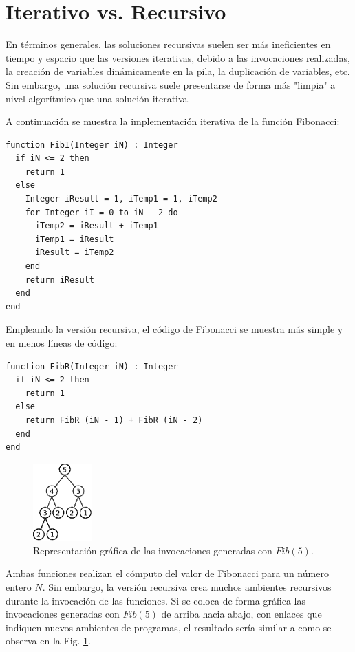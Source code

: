 \section{Iterativo vs. Recursivo}

En términos generales, las soluciones recursivas suelen ser más ineficientes en tiempo y espacio que las versiones iterativas, debido a las invocaciones realizadas, la creación de variables dinámicamente en la pila, la duplicación de variables, etc. Sin embargo, una solución recursiva suele presentarse de forma más "limpia" a nivel algorítmico que una solución iterativa.

A continuación se muestra la implementación iterativa de la función Fibonacci:

\begin{lstlisting}[upquote=true, language=pseudo]
function FibI(Integer iN) : Integer
  if iN <= 2 then
	return 1
  else
    Integer iResult = 1, iTemp1 = 1, iTemp2
    for Integer iI = 0 to iN - 2 do
      iTemp2 = iResult + iTemp1
      iTemp1 = iResult
      iResult = iTemp2
    end
    return iResult
  end
end
\end{lstlisting}

Empleando la versión recursiva, el código de Fibonacci se muestra más simple y en menos líneas de código:

\begin{lstlisting}[upquote=true, language=pseudo]
function FibR(Integer iN) : Integer
  if iN <= 2 then
	return 1
  else
    return FibR (iN - 1) + FibR (iN - 2)
  end
end
\end{lstlisting}

\begin{figure}[htpb!]
  \begin{center}
    \includegraphics[width=0.2\textwidth]{images/fibonacciTree.eps}
  \end{center}
  \caption{Representación gráfica de las invocaciones generadas con $Fib(5)$.}
  \label{fig:Ch1fib}
\end{figure}

Ambas funciones realizan el cómputo del valor de Fibonacci para un número entero $N$. Sin embargo, la versión recursiva crea muchos ambientes recursivos durante la invocación de las funciones. Si se coloca de forma gráfica las invocaciones generadas con $Fib(5)$ de arriba hacia abajo, con enlaces que indiquen nuevos ambientes de programas, el resultado sería similar a como se observa en la Fig. \ref{fig:Ch1fib}. 

